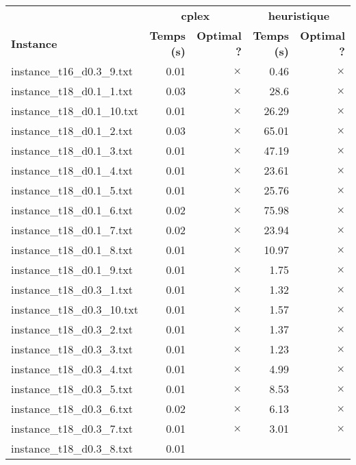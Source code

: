 \documentclass{article}
\begin{document}
\newpage
\begin{center}
\renewcommand{\arraystretch}{1.4} 
 \begin{tabular}{lrrrr}
	\hline
 & \multicolumn{2}{c}{\textbf{cplex}} & \multicolumn{2}{c}{\textbf{heuristique}}\\
\textbf{Instance}  & \textbf{Temps (s)} & \textbf{Optimal ?}  & \textbf{Temps (s)} & \textbf{Optimal ?} \\\hline

instance\_t16\_d0.3\_9.txt & 0.01 & 
$\times$
 & 0.46 & 
$\times$
\\
instance\_t18\_d0.1\_1.txt & 0.03 & 
$\times$
 & 28.6 & 
$\times$
\\
instance\_t18\_d0.1\_10.txt & 0.01 & 
$\times$
 & 26.29 & 
$\times$
\\
instance\_t18\_d0.1\_2.txt & 0.03 & 
$\times$
 & 65.01 & 
$\times$
\\
instance\_t18\_d0.1\_3.txt & 0.01 & 
$\times$
 & 47.19 & 
$\times$
\\
instance\_t18\_d0.1\_4.txt & 0.01 & 
$\times$
 & 23.61 & 
$\times$
\\
instance\_t18\_d0.1\_5.txt & 0.01 & 
$\times$
 & 25.76 & 
$\times$
\\
instance\_t18\_d0.1\_6.txt & 0.02 & 
$\times$
 & 75.98 & 
$\times$
\\
instance\_t18\_d0.1\_7.txt & 0.02 & 
$\times$
 & 23.94 & 
$\times$
\\
instance\_t18\_d0.1\_8.txt & 0.01 & 
$\times$
 & 10.97 & 
$\times$
\\
instance\_t18\_d0.1\_9.txt & 0.01 & 
$\times$
 & 1.75 & 
$\times$
\\
instance\_t18\_d0.3\_1.txt & 0.01 & 
$\times$
 & 1.32 & 
$\times$
\\
instance\_t18\_d0.3\_10.txt & 0.01 & 
$\times$
 & 1.57 & 
$\times$
\\
instance\_t18\_d0.3\_2.txt & 0.01 & 
$\times$
 & 1.37 & 
$\times$
\\
instance\_t18\_d0.3\_3.txt & 0.01 & 
$\times$
 & 1.23 & 
$\times$
\\
instance\_t18\_d0.3\_4.txt & 0.01 & 
$\times$
 & 4.99 & 
$\times$
\\
instance\_t18\_d0.3\_5.txt & 0.01 & 
$\times$
 & 8.53 & 
$\times$
\\
instance\_t18\_d0.3\_6.txt & 0.02 & 
$\times$
 & 6.13 & 
$\times$
\\
instance\_t18\_d0.3\_7.txt & 0.01 & 
$\times$
 & 3.01 & 
$\times$
\\
instance\_t18\_d0.3\_8.txt & 0.01 & 

\end{tabular}
\end{center}
\end{document}
